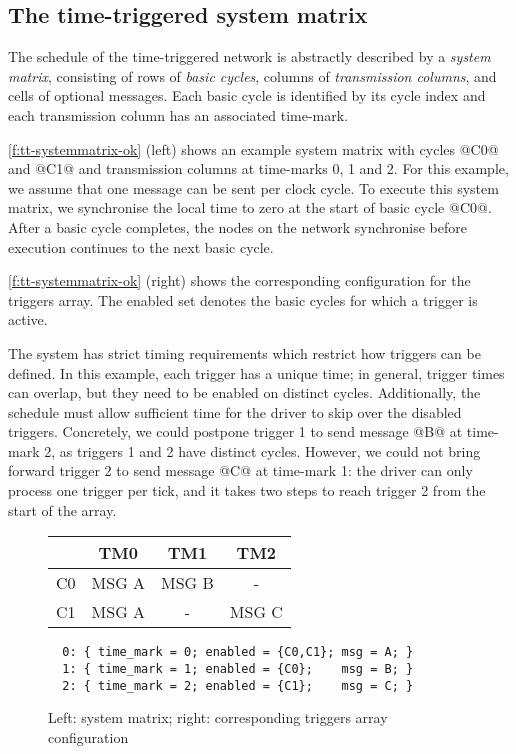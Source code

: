 \subsection{The time-triggered system matrix}

The schedule of the time-triggered network is abstractly described by a \emph{system matrix}, consisting of rows of \emph{basic cycles}, columns of \emph{transmission columns}, and cells of optional messages.
Each basic cycle is identified by its cycle index and each transmission column has an associated time-mark.

\autoref{f:tt-systemmatrix-ok} (left) shows an example system matrix with cycles @C0@ and @C1@ and transmission columns at time-marks 0, 1 and 2.
For this example, we assume that one message can be sent per clock cycle. %
To execute this system matrix, we synchronise the local time to zero at the start of basic cycle @C0@.
After a basic cycle completes, the nodes on the network synchronise before execution continues to the next basic cycle.

\autoref{f:tt-systemmatrix-ok} (right) shows the corresponding configuration for the triggers array.
The enabled set denotes the basic cycles for which a trigger is active.

The system has strict timing requirements which restrict how triggers can be defined.
In this example, each trigger has a unique time; in general, trigger times can overlap, but they need to be enabled on distinct cycles.
Additionally, the schedule must allow sufficient time for the driver to skip over the disabled triggers.
Concretely, we could postpone trigger 1 to send message @B@ at time-mark 2, as triggers 1 and 2 have distinct cycles.
However, we could not bring forward trigger 2 to send message @C@ at time-mark 1: the driver can only process one trigger per tick, and it takes two steps to reach trigger 2 from the start of the array.

\begin{figure}
  \begin{minipage}{0.38\textwidth}
\begin{tabular}{r|ccc}
   & TM0 & TM1 & TM2 \\
  \hline
  C0 & MSG A & MSG B & - \\
  C1 & MSG A & - & MSG C
\end{tabular}
\end{minipage}
\begin{minipage}{0.6\textwidth}
\small
\begin{verbatim}
  0: { time_mark = 0; enabled = {C0,C1}; msg = A; }
  1: { time_mark = 1; enabled = {C0};    msg = B; }
  2: { time_mark = 2; enabled = {C1};    msg = C; }
\end{verbatim}
\end{minipage}
  
\caption{Left: system matrix; right: corresponding triggers array configuration}
\label{f:tt-systemmatrix-ok}
\end{figure}

